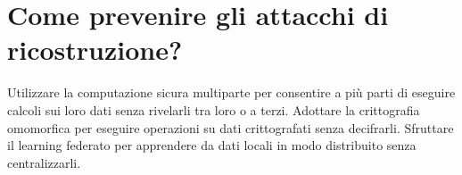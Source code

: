 \section{Come prevenire gli attacchi di ricostruzione?}

Utilizzare la computazione sicura multiparte per consentire a più parti di eseguire calcoli sui loro dati senza rivelarli tra loro o a terzi. Adottare la crittografia omomorfica per eseguire operazioni su dati crittografati senza decifrarli. Sfruttare il learning federato per apprendere da dati locali in modo distribuito senza centralizzarli.


